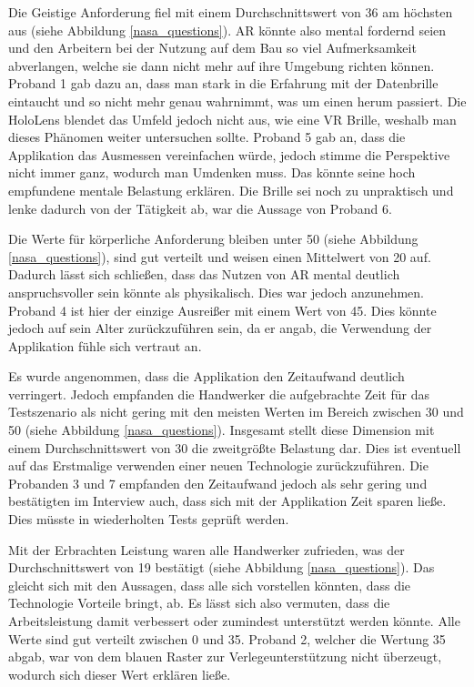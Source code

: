 Die Geistige Anforderung fiel mit einem Durchschnittswert von 36 am höchsten aus (siehe Abbildung \ref{nasa_questions}). AR könnte also mental fordernd seien und den Arbeitern bei der Nutzung auf dem Bau so viel Aufmerksamkeit abverlangen, welche sie dann nicht mehr auf ihre Umgebung richten können. Proband 1 gab dazu an, dass man stark in die Erfahrung mit der Datenbrille eintaucht und so nicht mehr genau wahrnimmt, was um einen herum passiert. Die HoloLens blendet das Umfeld jedoch nicht aus, wie eine VR Brille, weshalb man dieses Phänomen weiter untersuchen sollte. Proband 5 gab an, dass die Applikation das Ausmessen vereinfachen würde, jedoch stimme die Perspektive nicht immer ganz, wodurch man Umdenken muss. Das könnte seine hoch empfundene mentale Belastung erklären. Die Brille sei noch zu unpraktisch und lenke dadurch von der Tätigkeit ab, war die Aussage von Proband 6.

Die Werte für körperliche Anforderung bleiben unter 50 (siehe Abbildung \ref{nasa_questions}), sind gut verteilt und weisen einen Mittelwert von 20 auf. Dadurch lässt sich schließen, dass das Nutzen von AR mental deutlich anspruchsvoller sein könnte als physikalisch. Dies war jedoch anzunehmen. Proband 4 ist hier der einzige Ausreißer mit einem Wert von 45. Dies könnte jedoch auf sein Alter zurückzuführen sein, da er angab, die Verwendung der Applikation fühle sich vertraut an.

Es wurde angenommen, dass die Applikation den Zeitaufwand deutlich verringert. Jedoch empfanden die Handwerker die aufgebrachte Zeit für das Testszenario als nicht gering mit den meisten Werten im Bereich zwischen 30 und 50 (siehe Abbildung \ref{nasa_questions}). Insgesamt stellt diese Dimension mit einem Durchschnittswert von 30 die zweitgrößte Belastung dar. Dies ist eventuell auf das Erstmalige verwenden einer neuen Technologie zurückzuführen. Die Probanden 3 und 7 empfanden den Zeitaufwand jedoch als sehr gering und bestätigten im Interview auch, dass sich mit der Applikation Zeit sparen ließe. Dies müsste in wiederholten Tests geprüft werden.

Mit der Erbrachten Leistung waren alle Handwerker zufrieden, was der Durchschnittswert von 19 bestätigt (siehe Abbildung \ref{nasa_questions}). Das gleicht sich mit den Aussagen, dass alle sich vorstellen könnten, dass die Technologie Vorteile bringt, ab. Es lässt sich also vermuten, dass die Arbeitsleistung damit verbessert oder zumindest unterstützt werden könnte. Alle Werte sind gut verteilt zwischen 0 und 35. Proband 2, welcher die Wertung 35 abgab, war von dem blauen Raster zur Verlegeunterstützung nicht überzeugt, wodurch sich dieser Wert erklären ließe.

